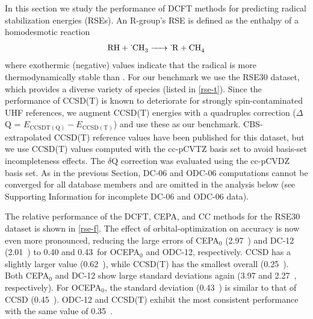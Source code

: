 {    
}

In this section we study the performance of DCFT methods for predicting radical
stabilization energies (RSEs). An R-group's RSE is defined as the enthalpy of a
homodesmotic reaction
\begin{equation}
    \ce{%
        RH
        +
        {}^.CH3
        ->
        {}^.R
        +
        CH4
    }
\end{equation}
where exothermic (negative) values indicate that the radical  is more
thermodynamically stable than .\cite{Zipse:2006p163}
For our benchmark we use the RSE30 dataset\cite{Soydas:2013p1452}, which
provides a diverse variety of  species (listed in \cref{rse-t}).
Since the performance of CCSD(T) is known to deteriorate for strongly
spin-contaminated UHF
references,\cite{Byrd:2001p9736,Beran:2003p2488,Lochan:2007p164101,Kurlancheek:2009p1223,Bozkaya:2011p224103}
we augment CCSD(T) energies with a quadruples correction ($\Delta$Q  =
$E_\mathrm{CCSDT(Q)}-E_\mathrm{CCSD(T)}$) and use these as our benchmark.
CBS-extrapolated CCSD(T) reference values have been published for this
dataset,\cite{Soydas:2014p1073} but we use CCSD(T) values computed with the
cc-pCVTZ basis set to avoid basis-set incompleteness effects. 
The $\delta$Q correction was evaluated using the cc-pCVDZ basis set. 
As in the previous Section, DC-06 and ODC-06 computations cannot be converged
for all database members and are omitted in the analysis below (see Supporting
Information for incomplete DC-06 and ODC-06 data).


The relative performance of the DCFT, CEPA, and CC methods for the RSE30 dataset
is shown in \cref{rse-f}.
The effect of orbital-optimization on accuracy is now even more pronounced,
reducing the large \mae errors of CEPA$_0$ (2.97~\kcal) and DC-12 (2.01~\kcal)
to 0.40 and 0.43~\kcal for OCEPA$_0$ and ODC-12, respectively. CCSD has a
slightly larger \mae value (0.62~\kcal), while CCSD(T) has the smallest overall
\mae (0.25~\kcal).
Both CEPA$_0$ and DC-12 show large standard deviations again (3.97 and
2.27~\kcal, respectively).
For OCEPA$_0$, the standard deviation (0.43~\kcal) is similar to that of CCSD
(0.45~\kcal). ODC-12 and CCSD(T) exhibit the most consistent performance with
the same \std value of 0.35~\kcal.

